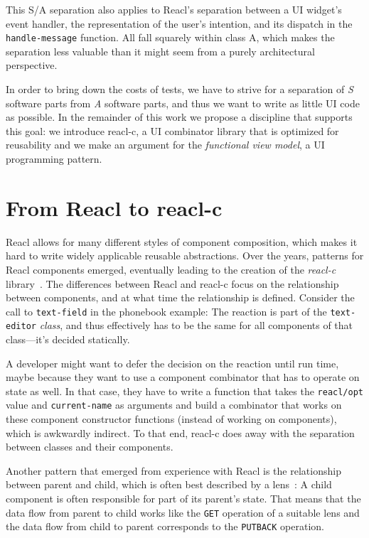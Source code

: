 \documentclass[sigplan,review,screen]{acmart}
\begin{document}
This S/A separation also applies to Reacl's separation between a UI
widget's event handler, the representation of the user's intention,
and its dispatch in the \texttt{handle-message} function.  All fall
squarely within class A, which makes the separation less valuable than
it might seem from a purely architectural perspective.

In order to bring down the costs of tests, we have to strive for
a separation of \textit{S} software parts from
\textit{A} software parts, and thus we want to write as little
UI code as possible. In the remainder of this work we propose a
discipline that supports this goal: we introduce reacl-c, a UI
combinator library that is optimized for reusability and we make an
argument for the \textit{functional view model}, a UI programming
pattern.

\section{From Reacl to reacl-c}
\label{sec:reacl-c}

Reacl allows for many different styles of component
composition, which makes it hard to write widely applicable reusable
abstractions. Over the years, patterns for
Reacl components emerged, eventually leading to the creation of the \textit{reacl-c}
library~\cite{reacl-c}.
The differences between Reacl and reacl-c focus on the relationship
between components, and at what time the relationship is
defined.  Consider the call to \texttt{text-field} in the
phonebook example:
The reaction is part of the \texttt{text-editor} \emph{class}, and
thus effectively has to be the same for all components of that
class---it's decided statically.

A developer might want to defer the decision on the reaction until run time,
maybe because they want to use a
component combinator that has to operate on state as well.
In that case, they have
to write a function that takes the \texttt{reacl/opt} value and
\texttt{current-name} as arguments and build a combinator
that works on these component constructor functions (instead of
working on components), which is awkwardly indirect.
To that end, reacl-c does away with the
separation between classes and their components.

Another pattern that emerged from experience with Reacl
is the relationship between parent
and child, which is often best described by a lens~\cite{Lenses}:
A child component is often responsible for part of its parent's
state. That means that the data flow from parent to child works like
the \texttt{GET} operation of a suitable lens and the data flow from
child to parent corresponds to the \texttt{PUTBACK} operation.
\end{document}
